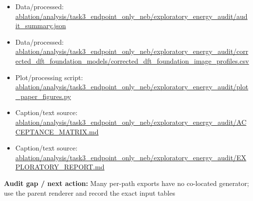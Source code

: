 \documentclass[10pt]{article}
\newcommand{\statusline}[1]{\colorbox{gray!12}{\parbox{0.96\linewidth}{#1}}}
\begin{document}
\begin{itemize}[leftmargin=1.4em,noitemsep]
\item Data/processed: \begingroup\scriptsize\url{ablation/analysis/task3_endpoint_only_neb/exploratory_energy_audit/audit_summary.json}\endgroup
\item Data/processed: \begingroup\scriptsize\url{ablation/analysis/task3_endpoint_only_neb/exploratory_energy_audit/corrected_dft_foundation_models/corrected_dft_foundation_image_profiles.csv}\endgroup
\item Plot/processing script: \begingroup\scriptsize\url{ablation/analysis/task3_endpoint_only_neb/exploratory_energy_audit/plot_paper_figures.py}\endgroup
\item Caption/text source: \begingroup\scriptsize\url{ablation/analysis/task3_endpoint_only_neb/exploratory_energy_audit/ACCEPTANCE_MATRIX.md}\endgroup
\item Caption/text source: \begingroup\scriptsize\url{ablation/analysis/task3_endpoint_only_neb/exploratory_energy_audit/EXPLORATORY_REPORT.md}\endgroup
\end{itemize}
\statusline{\textbf{Audit gap / next action:} Many per-path exports have no co-located generator; use the parent renderer and record the exact input tables}
\vfill
\clearpage
\end{document}
